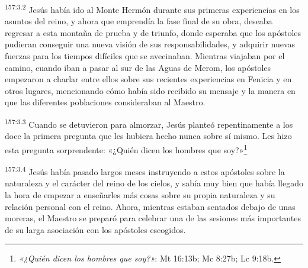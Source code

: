 \par 
\textsuperscript{157:3.2} Jesús había ido al Monte Hermón durante sus primeras experiencias en los asuntos del reino, y ahora que emprendía la fase final de su obra, deseaba regresar a esta montaña de prueba y de triunfo, donde esperaba que los apóstoles pudieran conseguir una nueva visión de sus responsabilidades, y adquirir nuevas fuerzas para los tiempos difíciles que se avecinaban. Mientras viajaban por el camino, cuando iban a pasar al sur de las Aguas de Merom, los apóstoles empezaron a charlar entre ellos sobre sus recientes experiencias en Fenicia y en otros lugares, mencionando cómo había sido recibido su mensaje y la manera en que las diferentes poblaciones consideraban al Maestro.

\par 
\textsuperscript{157:3.3} Cuando se detuvieron para almorzar, Jesús planteó repentinamente a los doce la primera pregunta que les hubiera hecho nunca sobre sí mismo. Les hizo esta pregunta sorprendente: «¿Quién dicen los hombres que soy?»\footnote{\textit{«¿Quién dicen los hombres que soy?»}: Mt 16:13b; Mc 8:27b; Lc 9:18b.}

\par 
\textsuperscript{157:3.4} Jesús había pasado largos meses instruyendo a estos apóstoles sobre la naturaleza y el carácter del reino de los cielos, y sabía muy bien que había llegado la hora de empezar a enseñarles más cosas sobre su propia naturaleza y su relación personal con el reino. Ahora, mientras estaban sentados debajo de unas moreras, el Maestro se preparó para celebrar una de las sesiones más importantes de su larga asociación con los apóstoles escogidos.

